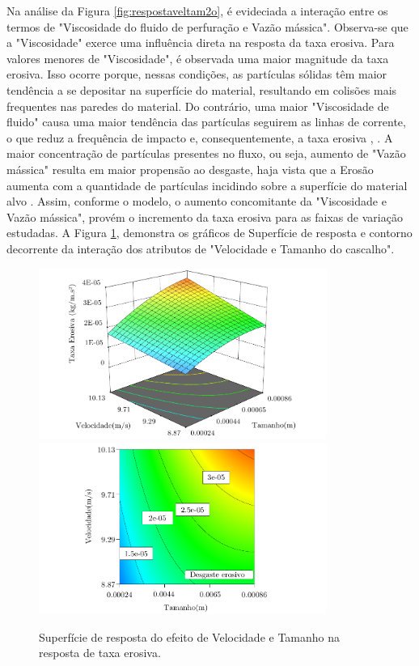 Na análise da Figura \ref{fig:respostaveltam2o}, é evideciada a interação entre os termos de "Viscosidade do fluido de perfuração e Vazão mássica". Observa-se que a "Viscosidade" exerce uma influência direta na resposta da taxa erosiva. Para valores menores de "Viscosidade", é observada uma maior magnitude da taxa erosiva. Isso ocorre porque, nessas condições, as partículas sólidas têm maior tendência a se depositar na superfície do material, resultando em colisões mais frequentes nas paredes do material. Do contrário, uma maior "Viscosidade de fluido" causa uma maior tendência das partículas seguirem as linhas de corrente, o que reduz a frequência de impacto e, consequentemente, a taxa erosiva \cite{tsai}, \cite{yabuki}. A maior concentração de partículas presentes no fluxo, ou seja, aumento de "Vazão mássica" resulta em maior propensão ao desgaste, haja vista que a Erosão aumenta com a quantidade de partículas incidindo sobre a superfície do material alvo \cite{gandhi}. Assim, conforme o modelo, o aumento concomitante da "Viscosidade e Vazão mássica", provém o incremento da taxa erosiva para as faixas de variação estudadas. A Figura \ref{fig:respostaveltama}, demonstra os gráficos de Superfície de resposta e contorno decorrente da interação dos atributos de "Velocidade e Tamanho do cascalho".

\begin{figure}[H] 
    \centering  
    \includegraphics[width=0.84\textwidth]{Figuras/superficie.pdf}  
    \includegraphics[width=0.84\textwidth]{Figuras/contorno2.pdf} 
    \caption{Superfície de resposta do efeito de Velocidade e Tamanho na resposta de taxa erosiva.}  
    \label{fig:respostaveltama}  
\end{figure}

